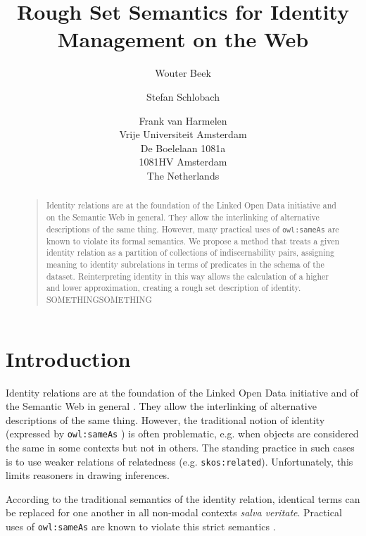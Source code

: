 \documentclass[letterpaper]{article}
\begin{document}
\title{Rough Set Semantics for Identity Management on the Web}
\author{Wouter Beek \and Stefan Schlobach \and Frank van Harmelen\\
Vrije Universiteit Amsterdam\\
De Boelelaan 1081a\\
1081HV Amsterdam\\
The Netherlands}
\maketitle
\begin{abstract}
\begin{quote}
Identity relations are at the foundation of the Linked Open Data initiative and on the Semantic Web in general. They allow the interlinking of alternative descriptions of the same thing. However, many practical uses of \verb|owl:sameAs| are known to violate its formal semantics. We propose a method that treats a given identity relation as a partition of collections of indiscernability pairs, assigning meaning to identity subrelations in terms of predicates in the schema of the dataset. Reinterpreting identity in this way allows the calculation of a higher and lower approximation, creating a rough set description of identity. SOMETHINGSOMETHING
\end{quote}
\end{abstract}

\section{Introduction}
\label{sec:introduction}

Identity relations are at the foundation of the Linked Open Data initiative and of the Semantic Web in general \cite{bizer_cyganiak_heath_2007}. They allow the interlinking of alternative descriptions of the same thing. However, the traditional notion of identity (expressed by \verb|owl:sameAs| \cite{motic_paterschneider_grau_2012}) is often problematic, e.g. when objects are considered the same in some contexts but not in others. The standing practice in such cases is to use weaker relations of relatedness (e.g. \verb|skos:related|). Unfortunately, this limits reasoners in drawing inferences.

According to the traditional semantics of the identity relation, identical terms can be replaced for one another in all non-modal contexts \emph{salva veritate}. Practical uses of \verb|owl:sameAs| are known to violate this strict semantics \cite{halpin_hayes_2010,halpin_hayes_mccusker_mcguinness_thompson_2010}.
\end{document}
